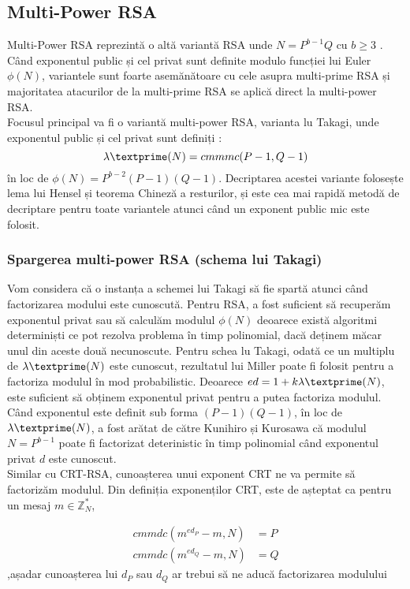 \documentclass[12]{report}
\begin{document}
\subsection{Multi-Power RSA}
Multi-Power RSA reprezintă o altă variantă RSA unde $N=P^{b-1}Q$ cu $b\geqslant 3$ .\\
Când exponentul public și cel privat sunt definite modulo funcției lui Euler $\phi(N)$, variantele sunt foarte asemănătoare cu cele asupra multi-prime RSA și majoritatea atacurilor de la multi-prime RSA se aplică direct la multi-power RSA. \\
Focusul principal va fi o variantă multi-power RSA, varianta lu Takagi, unde exponentul public și cel privat sunt definiți :
$$ \lambda \textprime (N) = cmmmc(P-1,Q-1) $$
în loc de $\phi(N) = P^{b-2}(P-1)(Q-1)$. Decriptarea acestei variante folosește lema lui Hensel și teorema Chineză a resturilor, și este cea mai rapidă metodă de decriptare pentru toate variantele atunci când un exponent public mic este folosit. \\
\subsubsection{Spargerea multi-power RSA (schema lui Takagi)}
Vom considera că o instanța a schemei lui Takagi să fie spartă atunci când factorizarea modului este cunoscută. Pentru RSA, a fost suficient să recuperăm exponentul privat sau să calculăm modulul $\phi(N)$ deoarece există algoritmi determiniști ce pot rezolva problema în timp polinomial, dacă deținem măcar unul din aceste două necunoscute. Pentru schea lu Takagi, odată ce un multiplu de $\lambda \textprime (N)$ este cunoscut, rezultatul lui Miller \cite{Milner3} poate fi folosit pentru a factoriza modulul în mod probabilistic. Deoarece $ed= 1 + k \lambda \textprime (N)$, este suficient să obținem exponentul privat pentru a putea factoriza modulul. Când exponentul este definit sub forma $(P-1)(Q-1)$, în loc de $\lambda \textprime (N)$, a fost arătat de către Kunihiro și Kurosawa \cite{Kunihiro} că modulul $N=P^{b-1}$ poate fi factorizat deterinistic în timp polinomial când exponentul privat $d$ este cunoscut. \\
Similar cu CRT-RSA, cunoașterea unui exponent CRT ne va permite să factorizăm modulul. Din definiția exponenților CRT, este de așteptat ca pentru un mesaj $ m \in \mathbb{Z}_{N}^{*}$,

\begin{align*}
cmmdc(m^{ed_P} -m ,N) &=P \\
cmmdc(m^{ed_Q} -m ,N) &=Q
\end{align*} 
,așadar cunoașterea lui $d_P$ sau $d_Q$ ar trebui să ne aducă factorizarea modulului
\end{document}
